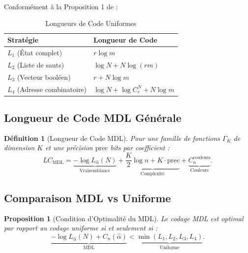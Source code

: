 \documentclass[12pt,a4paper]{article}
\newtheorem{prop}{Proposition}[section]
\newtheorem{defi}{Définition}[section]
\begin{document}
	Conformément à la Proposition 1 de \cite{uniform_temp_coding.tex} :
	
	\begin{table}[h]
		\centering
		\caption{Longueurs de Code Uniformes}
		\label{tab:longueurs_uniformes}
		\begin{tabular}{@{}ll@{}}
			\toprule
			\textbf{Stratégie} & \textbf{Longueur de Code} \\
			\midrule
			$L_1$ (État complet) & $r \log m$ \\
			$L_2$ (Liste de sauts) & $\log N + N \log(rm)$ \\
			$L_3$ (Vecteur booléen) & $r + N \log m$ \\
			$L_4$ (Adresse combinatoire) & $\log N + \log C_r^N + N \log m$ \\
			\bottomrule
		\end{tabular}
	\end{table}
	
	\subsection{Longueur de Code MDL Générale}
	\label{subsec:longueur_mdl}
	
	\begin{defi}[Longueur de Code MDL]
		\label{def:longueur_mdl}
		Pour une famille de fonctions $\Gamma_K$ de dimension $K$ et une précision $\text{prec}$ bits par coefficient :
		\begin{equation}
			LC_{\text{MDL}} = \underbrace{-\log L_{\hat{\alpha}}(N)}_{\text{Vraisemblance}} + \underbrace{\frac{K}{2} \log n + K \cdot \text{prec}}_{\text{Complexité}} + \underbrace{C_n^{\text{couleurs}}}_{\text{Couleurs}}.
		\end{equation}
	\end{defi}
	
	\subsection{Comparaison MDL vs Uniforme}
	\label{subsec:comparaison_mdl_uniforme}
	
	\begin{prop}[Condition d'Optimalité du MDL]
		\label{prop:optimalite_mdl}
		Le codage MDL est optimal par rapport au codage uniforme si et seulement si :
		\begin{equation}
			\underbrace{-\log L_{\hat{\alpha}}(N) + C_n(\hat{\alpha})}_{\text{MDL}} < \underbrace{\min(L_1, L_2, L_3, L_4)}_{\text{Uniforme}}.
		\end{equation}
	\end{prop}
	
\end{document}
